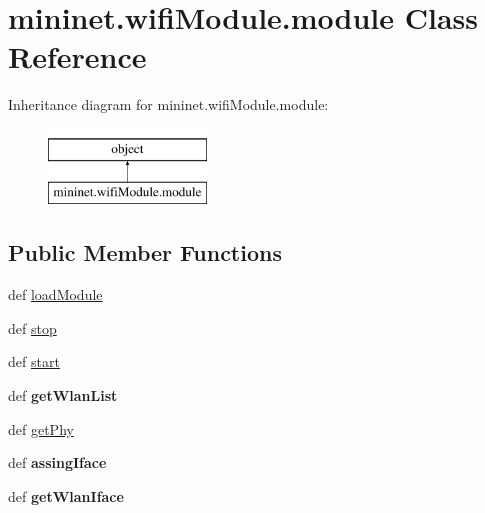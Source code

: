 \hypertarget{classmininet_1_1wifiModule_1_1module}{\section{mininet.\-wifi\-Module.\-module Class Reference}
\label{classmininet_1_1wifiModule_1_1module}
}
Inheritance diagram for mininet.\-wifi\-Module.\-module\-:\begin{figure}[H]
\begin{center}
\leavevmode
\includegraphics[height=2.000000cm]{classmininet_1_1wifiModule_1_1module}
\end{center}
\end{figure}
\subsection*{Public Member Functions}
\begin{DoxyCompactItemize}
\item 
def \hyperlink{classmininet_1_1wifiModule_1_1module_a8527224db26b4f2989c6189b075c1ce2}{load\-Module}
\item 
def \hyperlink{classmininet_1_1wifiModule_1_1module_a5a41a72e43608d1f7b640ae00ec3ccb2}{stop}
\item 
def \hyperlink{classmininet_1_1wifiModule_1_1module_ae18ef94aaf7c1e39f6e705003bf83750}{start}
\item 
\hypertarget{classmininet_1_1wifiModule_1_1module_a8a567417de222467a84c82d6bddcf022}{def {\bfseries get\-Wlan\-List}}\label{classmininet_1_1wifiModule_1_1module_a8a567417de222467a84c82d6bddcf022}

\item 
def \hyperlink{classmininet_1_1wifiModule_1_1module_af918ffcb56b56971d4689c9b0c78da6f}{get\-Phy}
\item 
\hypertarget{classmininet_1_1wifiModule_1_1module_ab7647591683f5969374a5ac4e1600324}{def {\bfseries assing\-Iface}}\label{classmininet_1_1wifiModule_1_1module_ab7647591683f5969374a5ac4e1600324}

\item 
\hypertarget{classmininet_1_1wifiModule_1_1module_ac454d404cd974bb420f7bc04711700c2}{def {\bfseries get\-Wlan\-Iface}}\label{classmininet_1_1wifiModule_1_1module_ac454d404cd974bb420f7bc04711700c2}

\end{DoxyCompactItemize}
